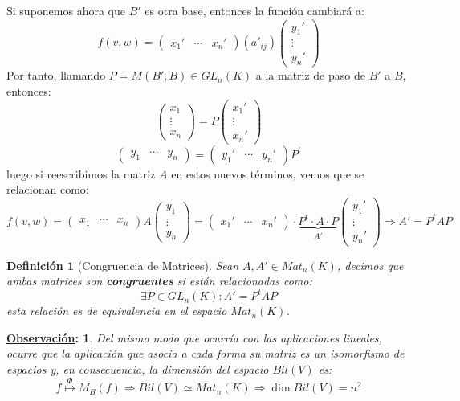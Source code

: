 \documentclass[10pt,a4paper,openright]{book}
\theoremstyle{break}
\newtheorem*{defi}{Definición}
\newtheorem*{obs}{\underline{Observación}:}
\begin{document}
Si suponemos ahora que $B'$ es otra base, entonces la función cambiará a:
$$f(v,w)=\begin{pmatrix} x_1' & \cdots & x_n'\end{pmatrix}(a'_{ij})\begin{pmatrix} y_1' \\ \vdots \\ y_n' \end{pmatrix} $$
Por tanto, llamando $P=M(B',B)\in GL_n(K)$ a la matriz de paso de $B'$ a $B$, entonces:
$$\begin{pmatrix} x_1 \\ \vdots \\ x_n\end{pmatrix}=P\begin{pmatrix} x_1' \\ \vdots \\ x_n' \end{pmatrix} $$
$$\begin{pmatrix} y_1 & \cdots & y_n\end{pmatrix}=\begin{pmatrix} y_1' & \cdots & y_n' \end{pmatrix} P^t$$
luego si reescribimos la matriz $A$ en estos nuevos términos, vemos que se relacionan como:
$$f(v,w)=\begin{pmatrix} x_1 & \cdots & x_n\end{pmatrix} A \begin{pmatrix} y_1 \\ \vdots \\ y_n \end{pmatrix} = \begin{pmatrix} x_1' & \cdots & x_n'\end{pmatrix}\cdot \underbrace{P^t \cdot A \cdot P}_{A'} \begin{pmatrix} y_1' \\ \vdots \\ y_n' \end{pmatrix} \Rightarrow A'=P^tAP$$
\begin{defi}[Congruencia de Matrices]
Sean $A, A'\in Mat_n(K)$, decimos que ambas matrices son \textbf{congruentes} si están relacionadas como:
$$\exists P \in GL_n(K) : A' = P^tAP$$
esta relación es de equivalencia en el espacio $Mat_n(K)$.
\end{defi}

\begin{obs}
Del mismo modo que ocurría con las aplicaciones lineales, ocurre que la aplicación que asocia a cada forma su matriz es un isomorfismo de espacios y, en consecuencia, la dimensión del espacio $Bil(V)$ es:
$$f\stackrel{\Phi}{\longmapsto} M_B(f)\Rightarrow Bil(V)\simeq Mat_n(K)\Rightarrow \dim Bil(V)=n^2$$
\end{obs}
\end{document}

